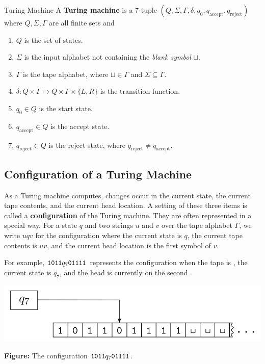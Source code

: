 \documentclass[letterpaper]{article}
\begin{document}
\begin{definition}{Turing Machine}{}
    A \textbf{Turing machine} is a 7-tuple $(Q, \Sigma, \Gamma, \delta, q_0, q_{\text{accept}}, q_{\text{reject}})$ where $Q, \Sigma, \Gamma$ are all finite sets and 
    \begin{enumerate}
        \item $Q$ is the set of states.
        \item $\Sigma$ is the input alphabet not containing the \emph{blank symbol} $\sqcup$.
        \item $\Gamma$ is the tape alphabet, where $\sqcup \in \Gamma$ and $\Sigma \subseteq \Gamma$. 
        \item $\delta: Q \times \Gamma \mapsto Q \times \Gamma \times \{L, R\}$ is the transition function. 
        \item $q_0 \in Q$ is the start state. 
        \item $q_{\text{accept}} \in Q$ is the accept state.
        \item $q_{\text{reject}} \in Q$ is the reject state, where $q_{\text{reject}} \neq q_{\text{accept}}$.   
    \end{enumerate} 
\end{definition}

\subsection{Configuration of a Turing Machine}
As a Turing machine computes, changes occur in the current state, the current tape contents, and the current head location. A setting of these three items is called a \textbf{configuration} of the Turing machine. They are often represented in a special way. For a state $q$ and two strings $u$ and $v$ over the tape alphabet $\Gamma$, we write $uqv$ for the configuration where the current state is $q$, the current tape contents is $uv$, and the current head location is the first symbol of $v$. 

\bigskip 

For example, $\texttt{1011}q_7\texttt{01111}$ represents the configuration when the tape is , the current state is $q_7$, and the head is currently on the second .
\begin{center}
    \includegraphics[scale=0.5]{../assets/turing_config_1.png}

    \textbf{Figure:} The configuration $\texttt{1011}q_7\texttt{01111}$. 
\end{center}
\end{document}
